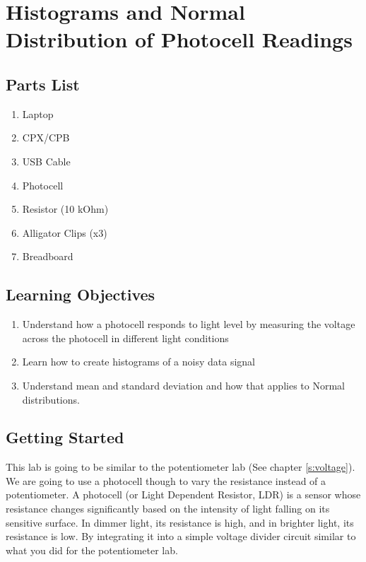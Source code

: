 \newpage

\section{Histograms and Normal Distribution of Photocell Readings}
\label{s:photocell}

\subsection{Parts List}

\begin{enumerate}[itemsep=-5pt]
\item Laptop
\item CPX/CPB
\item USB Cable
\item Photocell
\item Resistor (10 kOhm)
\item Alligator Clips (x3)
\item Breadboard
\end{enumerate}

\subsection{Learning Objectives}
\begin{enumerate}[itemsep=-5pt]
\item Understand how a photocell responds to light level by measuring the voltage across the photocell in different light conditions
\item Learn how to create histograms of a noisy data signal
\item Understand mean and standard deviation and how that applies to Normal distributions.
\end{enumerate}

\subsection{Getting Started}

This lab is going to be similar to the potentiometer lab (See chapter \ref{s:voltage}). We are going to use a photocell though to vary the resistance instead of a potentiometer. A photocell (or Light Dependent Resistor, LDR) is a sensor whose resistance changes significantly based on the intensity of light falling on its sensitive surface. In dimmer light, its resistance is high, and in brighter light, its resistance is low. By integrating it into a simple voltage divider circuit similar to what you did for the potentiometer lab. 

